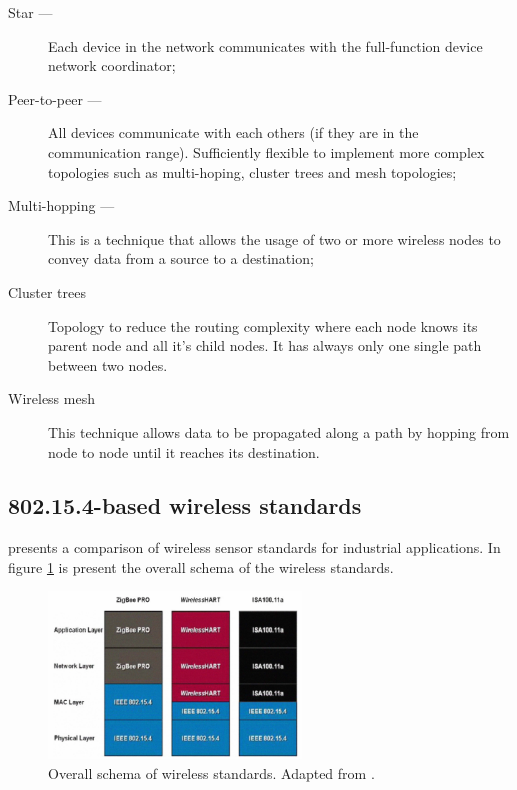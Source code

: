 \begin{description}
	\item[Star ---] Each device in the network communicates with the full-function device network coordinator;
	
	\item[Peer-to-peer ---] All devices communicate with each others (if they are in the communication range). Sufficiently flexible to implement more complex topologies such as multi-hoping, cluster trees and mesh topologies;
	
	\item[Multi-hopping ---] This is a technique that allows the usage of two or more wireless nodes to convey data from a source to a destination;
	
	\item[Cluster trees] Topology to reduce the routing complexity where each node knows its parent node and all it's child nodes. It has always only one single path between two nodes.
	
	\item[Wireless mesh] This technique allows data to be propagated along a path by hopping from node to node until it reaches its destination.
		
\end{description}

\subsection{802.15.4-based wireless standards}

\cite{Radmand2010} presents a comparison of wireless sensor standards for industrial applications. In figure \ref{fig:radmand2010} is present the overall schema of the wireless standards.


\begin{figure}[h!]
	\centering
	\includegraphics[width=0.6\textwidth,keepaspectratio]{figures/radmand2010}
	\caption{Overall schema of wireless standards. Adapted from \cite{Radmand2010}.}
	\label{fig:radmand2010}
\end{figure}


